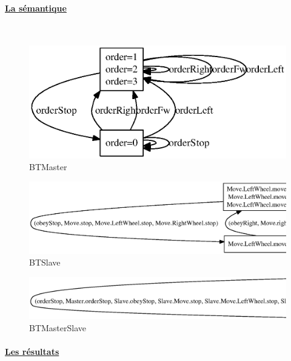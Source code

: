     \paragraph{\underline{La sémantique}}
    ~\\
    \begin{figure}[!ht]
     \begin{center}
      \includegraphics[width=16cm]{../src/altarica/BTMaster.eps}
      \caption{BTMaster}
     \end{center}
    \end{figure}
    \begin{figure}[!ht]
     \begin{center}
      \includegraphics[width=16cm]{../src/altarica/BTSlave.eps}
      \caption{BTSlave}
     \end{center}
    \end{figure}
    \begin{figure}[!ht]
     \begin{center}
      \includegraphics[width=16cm]{../src/altarica/BTMasterSlave.eps}
      \caption{BTMasterSlave}
     \end{center}
    \end{figure}
    \newpage
   
    \paragraph{\underline{Les résultats\\}}
    
    
    
    
    
    

